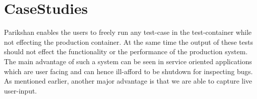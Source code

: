 \section{CaseStudies}
\label{sec:casestudy}

Parikshan enables the users to freely run any test-case in the test-container while not effecting the production container. 
At the same time the output of these tests should not effect the functionality or the performance of the production system.
The main advantage of such a system can be seen in service oriented applications which are user facing and can hence ill-afford to be shutdown for inspecting bugs.
As mentioned earlier, another major advantage is that we are able to capture live user-input. \\

\begin{table*}[ht]
	

\end{table*}
